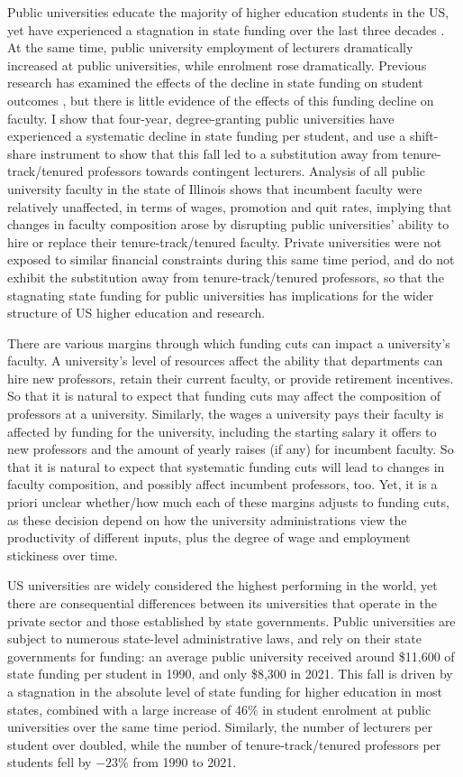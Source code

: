 Public universities educate the majority of higher education students in the US, yet have experienced a stagnation in state funding over the last three decades .
At the same time, public university employment of lecturers dramatically increased at public universities, while enrolment rose dramatically.
Previous research has examined the effects of the decline in state funding on student outcomes \citep{NBERw23736,NBERw27885}, but there is little evidence of the effects of this funding decline on faculty.
I show that four-year, degree-granting public universities have experienced a systematic decline in state funding per student, and use a shift-share instrument to show that this fall led to a substitution away from tenure-track/tenured professors towards contingent lecturers.
Analysis of all public university faculty in the state of Illinois shows that incumbent faculty were relatively unaffected, in terms of wages, promotion and quit rates, implying that changes in faculty composition arose by disrupting public universities' ability to hire or replace their tenure-track/tenured faculty. 
Private universities were not exposed to similar financial constraints during this same time period, and do not exhibit the substitution away from tenure-track/tenured professors, so that the stagnating state funding for public universities has implications for the wider structure of US higher education and research.

There are various margins through which funding cuts can impact a university's faculty.
A university's level of resources affect the ability that departments can hire new professors, retain their current faculty, or provide retirement incentives.
So that it is natural to expect that funding cuts may affect the composition of professors at a university.
Similarly, the wages a university pays their faculty is affected by funding for the university, including the starting salary it offers to new professors and the amount of yearly raises (if any) for incumbent faculty.
So that it is natural to expect that systematic funding cuts will lead to changes in faculty composition, and possibly affect incumbent professors, too.
Yet, it is a priori unclear whether/how much each of these margins adjusts to funding cuts, as these decision depend on how the university administrations view the productivity of different inputs, plus the degree of wage and employment stickiness over time.

US universities are widely considered the highest performing in the world, yet there are consequential differences between its universities that operate in the private sector and those established by state governments.
Public universities are subject to numerous state-level administrative laws, and rely on their state governments for funding: an average public university received around \$11,600 of state funding per student in 1990, and only \$8,300 in 2021.
This fall is driven by a stagnation in the absolute level of state funding for higher education in most states, combined with a large increase of 46\% in student enrolment at public universities over the same time period.
Similarly, the number of lecturers per student over doubled, while the number of tenure-track/tenured professors per students fell by $-23$\% from 1990 to 2021.


